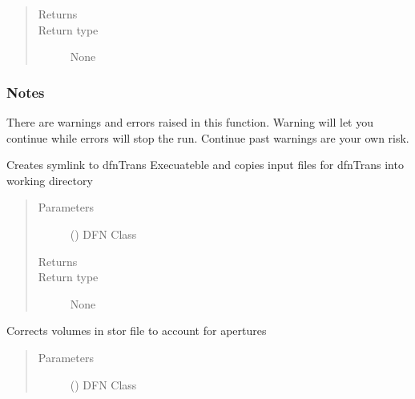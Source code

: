 \documentclass[letterpaper,10pt,english]{sphinxmanual}
\begin{document}
\begin{fulllineitems}
\begin{fulllineitems}
\begin{quote}
\begin{description}
\item[{Returns}] \leavevmode


\item[{Return type}] \leavevmode
None

\end{description}\end{quote}
\subsubsection*{Notes}

There are warnings and errors raised in this function. Warning will let you continue while errors will stop the run. Continue past warnings are your own risk.

\end{fulllineitems}


\begin{fulllineitems}
\label{\detokenize{pydfnworks:pydfnworks.general.dfnworks.DFNWORKS.copy_dfn_trans_files}}
Creates symlink to dfnTrans Execuateble and copies input files for dfnTrans into working directory
\begin{quote}\begin{description}
\item[{Parameters}] \leavevmode
{} () \textendash{} DFN Class

\item[{Returns}] \leavevmode


\item[{Return type}] \leavevmode
None

\end{description}\end{quote}

\end{fulllineitems}


\begin{fulllineitems}
\label{\detokenize{pydfnworks:pydfnworks.general.dfnworks.DFNWORKS.correct_stor_file}}
Corrects volumes in stor file to account for apertures
\begin{quote}\begin{description}
\item[{Parameters}] \leavevmode
{} () \textendash{} DFN Class


\end{description}
\end{quote}
\end{fulllineitems}
\end{fulllineitems}
\end{document}
